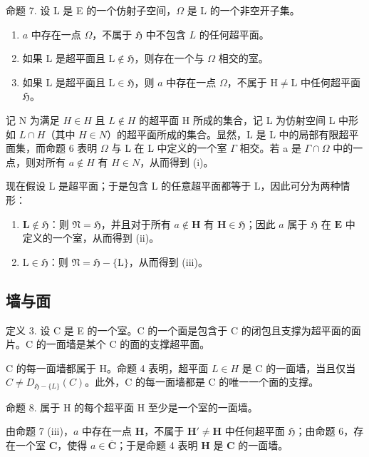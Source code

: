 命题 7. 设 L 是 E 的一个仿射子空间，\(\Omega\) 是 L 的一个非空开子集。

\begin{enumerate}
\def\labelenumi{(\roman{enumi})}
\item
  \(a\) 中存在一点 \(\Omega\)，不属于 \(\mathfrak{H}\) 中不包含 \(L\) 的任何超平面。
\item
  如果 \(\mathrm{L}\) 是超平面且 \(\mathrm{L} \notin \mathfrak{H}\)，则存在一个与 \(\Omega\) 相交的室。
\item
  如果 \(\mathrm{L}\) 是超平面且 \(\mathrm{L} \in \mathfrak{H}\)，则 \(a\) 中存在一点 \(\Omega\)，不属于 \(\mathrm{H} \neq \mathrm{L}\) 中任何超平面 \(\mathfrak{H}\)。
\end{enumerate}

记 N 为满足 \(H \in H\) 且 \(L \notin H\) 的超平面 H 所成的集合，记 L 为仿射空间 L 中形如 \(L \cap H\)（其中 \(H \in N\)）的超平面所成的集合。显然，L 是 L 中的局部有限超平面集，而命题 6 表明 \(\Omega\) 与 L 在 L 中定义的一个室 \(\Gamma\) 相交。若 a 是 \(\Gamma \cap \Omega\) 中的一点，则对所有 \(a \notin H\) 有 \(H \in N\)，从而得到 (i)。

现在假设 L 是超平面；于是包含 L 的任意超平面都等于 L，因此可分为两种情形：

\begin{enumerate}
\def\labelenumi{\alph{enumi})}
\item
  \(\mathbf{L} \notin \mathfrak{H}\)：则 \(\mathfrak{N} = \mathfrak{H}\)，并且对于所有 \(a \notin \mathbf{H}\) 有 \(\mathbf{H} \in \mathfrak{H}\)；因此 \(a\) 属于 \(\mathfrak{H}\) 在 \(\mathbf{E}\) 中定义的一个室，从而得到 (ii)。
\item
  \(\mathrm{L} \in \mathfrak{H}\)：则 \(\mathfrak{N} = \mathfrak{H} - \{\mathrm{L}\}\)，从而得到 (iii)。
\end{enumerate}

\subsection{墙与面}

定义 3. 设 C 是 E 的一个室。C 的一个面是包含于 C 的闭包且支撑为超平面的面片。C 的一面墙是某个 C 的面的支撑超平面。

C 的每一面墙都属于 H。命题 4 表明，超平面 \(L \in H\) 是 C 的一面墙，当且仅当 \(C \neq D_{\mathfrak{H} - \{L\}}(C)\)。此外，C 的每一面墙都是 C 的唯一一个面的支撑。

命题 8. 属于 H 的每个超平面 H 至少是一个室的一面墙。

由命题 7 (iii)，\(a\) 中存在一点 \(\mathbf{H}\)，不属于 \(\mathbf{H}' \neq \mathbf{H}\) 中任何超平面 \(\mathfrak{H}\)；由命题 6，存在一个室 \(\mathbf{C}\)，使得 \(a \in \overline{\mathbf{C}}\)；于是命题 4 表明 \(\mathbf{H}\) 是 \(\mathbf{C}\) 的一面墙。

